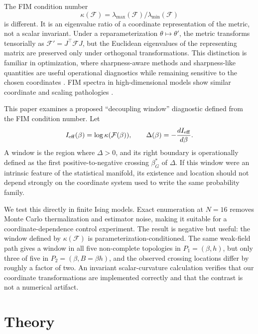 \documentclass[11pt,a4paper]{article}
\begin{document}
The FIM condition number
\begin{equation}
\kappa(\mathcal F)=\lambda_{\max}(\mathcal F)/\lambda_{\min}(\mathcal F)
\end{equation}
is different.  It is an eigenvalue ratio of a coordinate representation of the metric, not a scalar invariant.  Under a reparameterization $\theta\mapsto\theta'$, the metric transforms tensorially as $\mathcal F'=J^\top \mathcal F J$, but the Euclidean eigenvalues of the representing matrix are preserved only under orthogonal transformations.  This distinction is familiar in optimization, where sharpness-aware methods and sharpness-like quantities are useful operational diagnostics while remaining sensitive to the chosen coordinates \citep{foret2021sharpness, dinh2017sharp}.  FIM spectra in high-dimensional models show similar coordinate and scaling pathologies \citep{karakida2021pathological}.

This paper examines a proposed ``decoupling window'' diagnostic defined from the FIM condition number.  Let
\begin{equation}
I_{\rm eff}(\beta)=\log\kappa(\mathcal F(\beta)),\qquad
\Delta(\beta)=-\frac{d I_{\rm eff}}{d\beta}.
\end{equation}
A window is the region where $\Delta>0$, and its right boundary is operationally defined as the first positive-to-negative crossing $\beta_G^*$ of $\Delta$.  If this window were an intrinsic feature of the statistical manifold, its existence and location should not depend strongly on the coordinate system used to write the same probability family.

We test this directly in finite Ising models.  Exact enumeration at $N=16$ removes Monte Carlo thermalization and estimator noise, making it suitable for a coordinate-dependence control experiment.  The result is negative but useful: the window defined by $\kappa(\mathcal F)$ is parameterization-conditioned.  The same weak-field path gives a window in all five non-complete topologies in $P_1=(\beta,h)$, but only three of five in $P_2=(\beta,B=\beta h)$, and the observed crossing locations differ by roughly a factor of two.  An invariant scalar-curvature calculation verifies that our coordinate transformations are implemented correctly and that the contrast is not a numerical artifact.

\section{Theory}
\label{sec:theory}
\end{document}
